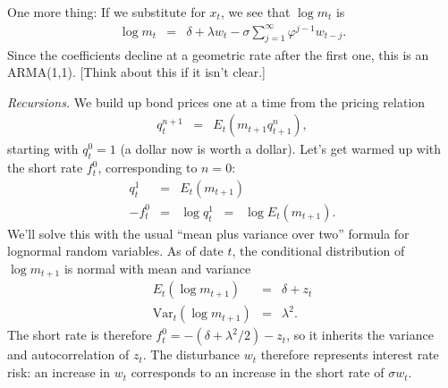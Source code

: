 \documentclass[11pt]{article}
\begin{document}
One more thing:
If we substitute for $x_t$, we see that $\log m_t$ is
\begin{eqnarray}
    \log m_t &=& \delta + \lambda w_t - \sigma \sum_{j=1}^\infty \varphi^{j-1} w_{t-j} .
    \label{eq:vasicek-ma}
\end{eqnarray}
Since the coefficients decline at a geometric rate after the first one,
this is an ARMA(1,1).
[Think about this if it isn't clear.]

{\it Recursions.\/}
We build up bond prices one at a time from
the pricing relation
\begin{eqnarray*}
    q^{n+1}_t &=& E_t \left( m_{t+1} q^n_{t+1} \right) ,
\end{eqnarray*}
starting with $q^0_t = 1$ (a dollar now is worth a dollar).
Let's get warmed up with the short rate $f^0_t$, corresponding
to $n=0$:
\begin{eqnarray*}
    q^1_t   &=&  E_t (m_{t+1}) \\
    - f^0_t &=&  \log q^1_{t} \;\;=\;\; \log E_t (m_{t+1}) .
\end{eqnarray*}
We'll solve this with the usual ``mean plus variance over two''
formula for lognormal random variables.
As of date $t$,
the conditional distribution of $\log m_{t+1}$ is
normal with mean and variance
\begin{eqnarray*}
    E_t \left( \log m_{t+1}\right) &=& \delta + z_t \\
    \mbox{Var}_t \left( \log m_{t+1} \right) &=& \lambda^2 .
\end{eqnarray*}
The short rate is therefore
$ f^0_t =  - (\delta + \lambda^2/2) - z_t$,
so it inherits the variance and autocorrelation of $z_t$.
The disturbance $w_t$ therefore represents interest rate risk:
an increase in $w_t$ corresponds to an increase in the short rate
of $\sigma w_t$.
\end{document}
